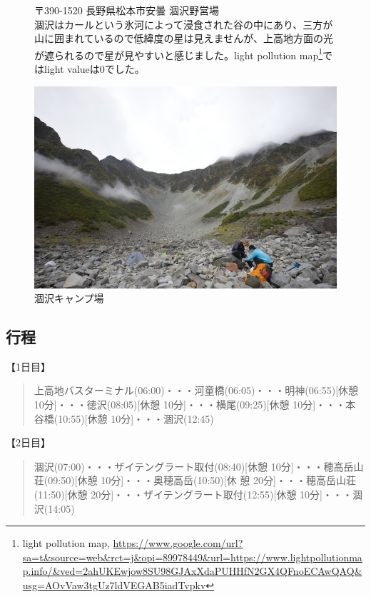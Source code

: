\documentclass[../main]{subfiles}
\begin{document}
\begin{figure}
\begin{minipage}{0.45\textwidth} %
  〒390-1520 長野県松本市安曇 涸沢野営場 \\

  涸沢はカールという氷河によって浸食された谷の中にあり、三方が山に囲まれているので低緯度の星は見えませんが、上高地方面の光が遮られるので星が見やすいと感じました。light pollution map\footnote{light pollution map, \url{https://www.google.com/url?sa=t&source=web&rct=j&opi=89978449&url=https://www.lightpollutionmap.info/&ved=2ahUKEwjow8SU98GJAxXdaPUHHfN2GX4QFnoECAwQAQ&usg=AOvVaw3tgUz7ldVEGAB5iadTvpkv}}ではlight valueは0でした。
\end{minipage}%
\hfill
\begin{minipage}{0.45\textwidth} %
    \centering
    \includegraphics[width=\linewidth]{sections/mori/IMG_2413.jpg} %
    \caption{涸沢キャンプ場}
\end{minipage}
\end{figure}

\subsection{行程}
【1日目】
\begin{quote}
  上高地バスターミナル(06:00)・・・河童橋(06:05)・・・明神(06:55)[休憩 10分]・・・徳沢(08:05)[休憩 10分]・・・横尾(09:25)[休憩 10分]・・・本谷橋(10:55)[休憩 10分]・・・涸沢(12:45)
\end{quote}

【2日目】
\begin{quote}
  涸沢(07:00)・・・ザイテングラート取付(08:40)[休憩 10分]・・・穂高岳山荘(09:50)[休憩 10分]・・・奥穂高岳(10:50)[休
  憩 20分]・・・穂高岳山荘(11:50)[休憩 20分]・・・ザイテングラート取付(12:55)[休憩 10分]・・・涸沢(14:05)
\end{quote}
\end{document}
